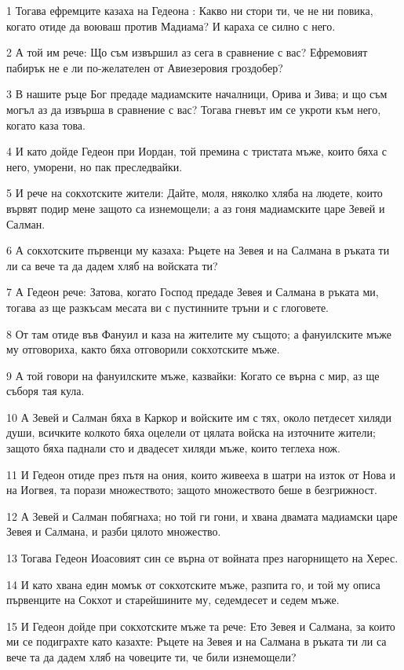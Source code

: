 \par 1 Тогава ефремците казаха на Гедеона : Какво ни стори ти, че не ни повика, когато отиде да воюваш против Мадиама? И караха се силно с него.
\par 2 А той им рече: Що съм извършил аз сега в сравнение с вас? Ефремовият пабирък не е ли по-желателен от Авиезеровия гроздобер?
\par 3 В нашите ръце Бог предаде мадиамските началници, Орива и Зива; и що съм могъл аз да извърша в сравнение с вас? Тогава гневът им се укроти към него, когато каза това.
\par 4 И като дойде Гедеон при Иордан, той премина с тристата мъже, които бяха с него, уморени, но пак преследвайки.
\par 5 И рече на сокхотските жители: Дайте, моля, няколко хляба на людете, които вървят подир мене защото са изнемощели; а аз гоня мадиамските царе Зевей и Салман.
\par 6 А сокхотските първенци му казаха: Ръцете на Зевея и на Салмана в ръката ти ли са вече та да дадем хляб на войската ти?
\par 7 А Гедеон рече: Затова, когато Господ предаде Зевея и Салмана в ръката ми, тогава аз ще разкъсам месата ви с пустинните тръни и с глоговете.
\par 8 От там отиде във Фануил и каза на жителите му същото; а фануилските мъже му отговориха, както бяха отговорили сокхотските мъже.
\par 9 А той говори на фануилските мъже, казвайки: Когато се върна с мир, аз ще съборя тая кула.
\par 10 А Зевей и Салман бяха в Каркор и войските им с тях, около петдесет хиляди души, всичките колкото бяха оцелели от цялата войска на източните жители; защото бяха паднали сто и двадесет хиляди мъже, които теглеха нож.
\par 11 И Гедеон отиде през пътя на ония, които живееха в шатри на изток от Нова и на Иогвея, та порази множеството; защото множеството беше в безгрижност.
\par 12 А Зевей и Салман побягнаха; но той ги гони, и хвана двамата мадиамски царе Зевея и Салмана, и разби цялото множество.
\par 13 Тогава Гедеон Иоасовият син се върна от войната през нагорнището на Херес.
\par 14 И като хвана един момък от сокхотските мъже, разпита го, и той му описа първенците на Сокхот и старейшините му, седемдесет и седем мъже.
\par 15 И Гедеон дойде при сокхотските мъже та рече: Ето Зевея и Салмана, за които ми се подиграхте като казахте: Ръцете на Зевея и на Салмана в ръката ти ли са вече та да дадем хляб на човеците ти, че били изнемощели?

